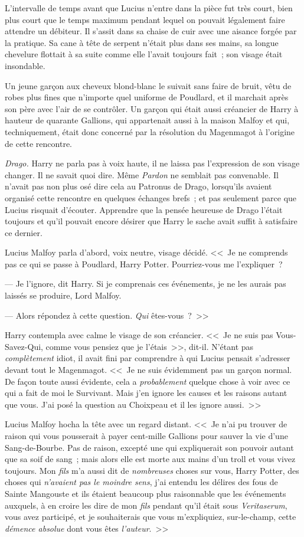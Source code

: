 L'intervalle de temps avant que Lucius n'entre dans la pièce fut très court, bien plus court que le temps maximum pendant lequel on pouvait légalement faire attendre un débiteur. Il s'assit dans sa chaise de cuir avec une aisance forgée par la pratique. Sa cane à tête de serpent n'était plus dans ses mains, sa longue chevelure flottait à sa suite comme elle l'avait toujours fait~; son visage était insondable.

Un jeune garçon aux cheveux blond-blanc le suivait sans faire de bruit, vêtu de robes plus fines que n'importe quel uniforme de Poudlard, et il marchait après son père avec l'air de se contrôler. Un garçon qui était aussi créancier de Harry à hauteur de quarante Gallions, qui appartenait aussi à la maison Malfoy et qui, techniquement, était donc concerné par la résolution du Magenmagot à l'origine de cette rencontre.

\emph{Drago.} Harry ne parla pas à voix haute, il ne laissa pas l'expression de son visage changer. Il ne savait quoi dire. Même \emph{Pardon} ne semblait pas convenable. Il n'avait pas non plus osé dire cela au Patronus de Drago, lorsqu'ils avaient organisé cette rencontre en quelques échanges brefs~; et pas seulement parce que Lucius risquait d'écouter. Apprendre que la pensée heureuse de Drago l'était toujours et qu'il pouvait encore désirer que Harry le sache avait suffit à satisfaire ce dernier.

Lucius Malfoy parla d'abord, voix neutre, visage décidé. <<~Je ne comprends pas ce qui se passe à Poudlard, Harry Potter. Pourriez-vous me l'expliquer~?

--- Je l'ignore, dit Harry. Si je comprenais ces événements, je ne les aurais pas laissés se produire, Lord Malfoy.

--- Alors répondez à cette question. \emph{Qui} êtes-vous~?~>>

Harry contempla avec calme le visage de son créancier. <<~Je ne suis pas Vous-Savez-Qui, comme vous pensiez que je l'étais~>>, dit-il. N'étant pas \emph{complètement} idiot, il avait fini par comprendre à qui Lucius pensait s'adresser devant tout le Magenmagot. <<~Je ne suis évidemment pas un garçon normal. De façon toute aussi évidente, cela a \emph{probablement} quelque chose à voir avec ce qui a fait de moi le Survivant. Mais j'en ignore les causes et les raisons autant que vous. J'ai posé la question au Choixpeau et il les ignore aussi.~>>

Lucius Malfoy hocha la tête avec un regard distant. <<~Je n'ai pu trouver de raison qui vous pousserait à payer cent-mille Gallions pour sauver la vie d'une Sang-de-Bourbe. Pas de raison, excepté une qui expliquerait son pouvoir autant que sa soif de sang~; mais alors elle est morte aux mains d'un troll et vous vivez toujours. Mon \emph{fils} m'a aussi dit de \emph{nombreuses} choses sur vous, Harry Potter, des choses qui \emph{n'avaient pas le moindre sens}, j'ai entendu les délires des fous de Sainte Mangouste et ils étaient beaucoup plus raisonnable que les événements auxquels, à en croire les dire de mon \emph{fils} pendant qu'il était sous \emph{Veritaserum}, vous avez participé, et je souhaiterais que vous m'expliquiez, sur-le-champ, cette \emph{démence absolue} dont vous êtes \emph{l'auteur}.~>>

